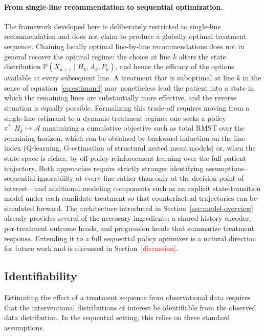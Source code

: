\documentclass[a4paper,10pt]{article}
\begin{document}
\paragraph{From single-line recommendation to sequential optimization.}
The framework developed here is deliberately restricted to single-line recommendation and does not claim to produce a globally optimal treatment sequence. Chaining locally optimal line-by-line recommendations does not in general recover the optimal regime: the choice at line $k$ alters the state distribution $\mathbb{P}(X_{k+1} \mid H_k, A_k, P_k)$, and hence the efficacy of the options available at every subsequent line. A treatment that is suboptimal at line $k$ in the sense of equation~\ref{eq:estimand} may nonetheless lead the patient into a state in which the remaining lines are substantially more effective, and the reverse situation is equally possible. Formalizing this trade-off requires moving from a single-line estimand to a dynamic treatment regime: one seeks a policy $\pi^{*} : H_k \mapsto \mathcal{A}$ maximizing a cumulative objective such as total RMST over the remaining horizon, which can be obtained by backward induction on the line index (Q-learning, G-estimation of structural nested mean models) or, when the state space is richer, by off-policy reinforcement learning over the full patient trajectory. Both approaches require strictly stronger identifying assumptions--sequential ignorability at every line rather than only at the decision point of interest---and additional modeling components such as an explicit state-transition model under each candidate treatment so that counterfactual trajectories can be simulated forward. The architecture introduced in Section~\ref{sec:model-overview} already provides several of the necessary ingredients: a shared history encoder, per-treatment outcome heads, and progression heads that summarize treatment response. Extending it to a full sequential policy optimizer is a natural direction for future work and is discussed in Section~\textcolor{red}{[discussion]}.

\subsection{Identifiability}

Estimating the effect of a treatment sequence from observational data requires that the interventional distributions of interest be identifiable from the observed data distribution. In the sequential setting, this relies on three standard assumptions.
\end{document}
